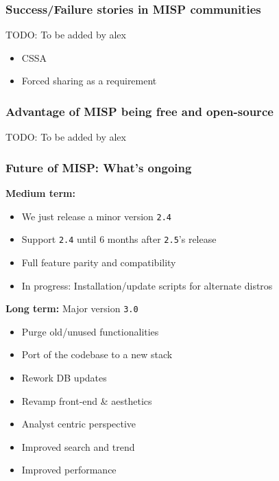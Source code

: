 \begin{frame}
    \frametitle{Success/Failure stories in MISP communities}
    TODO: To be added by alex
    \begin{itemize}
        \item CSSA
        \item Forced sharing as a requirement
    \end{itemize}
\end{frame}

\begin{frame}
    \frametitle{Advantage of MISP being free and open-source}
    TODO: To be added by alex
\end{frame}

\begin{frame}
    \frametitle{Future of MISP: What's ongoing}
    \begin{minipage}[t]{0.5\textwidth}
    \textbf{Medium term:}
    \begin{itemize}
        \item We just release a minor version \texttt{2.4}
        \item Support \texttt{2.4} until 6 months after \texttt{2.5}'s release
        \item Full feature parity and compatibility
        \item In progress: Installation/update scripts for alternate distros
    \end{itemize}
    \end{minipage}%
    \begin{minipage}[t]{0.5\textwidth}
    \textbf{Long term:} Major version \texttt{3.0}
    \begin{itemize}
        \item Purge old/unused functionalities
        \item Port of the codebase to a new stack
        \item Rework DB updates
        \item Revamp front-end \& aesthetics
        \item Analyst centric perspective
        \item Improved search and trend 
        \item Improved performance
    \end{itemize}
    \end{minipage}%
\end{frame}

